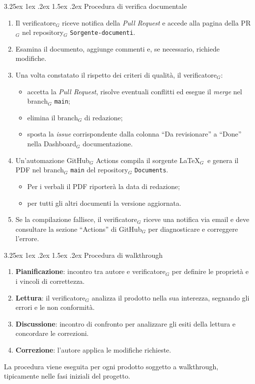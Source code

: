 \documentclass[a4paper, 10pt]{article}
\makeatletter
\renewcommand\paragraph{\@startsection{paragraph}{4}{\z@}%
  {3.25ex \@plus1ex \@minus .2ex}%
  {1.5ex \@plus .2ex}%
  {\normalfont\normalsize\bfseries}}
\makeatother
\begin{document}
\paragraph{Procedura di verifica documentale}
\begin{enumerate}
    \item Il verificatore$_G$ riceve notifica della \emph{Pull Request} e accede alla pagina della PR$_G$ nel repository$_G$ \texttt{Sorgente-documenti}.
    \item Esamina il documento, aggiunge commenti e, se necessario, richiede modifiche.
    \item Una volta constatato il rispetto dei criteri di qualità, il verificatore$_G$:
    \begin{itemize}
        \item accetta la \emph{Pull Request}, risolve eventuali conflitti ed esegue il \emph{merge} nel branch$_G$ \texttt{main};
        \item elimina il branch$_G$ di redazione;
        \item sposta la \emph{issue} corrispondente dalla colonna ``Da revisionare'' a ``Done'' nella Dashboard$_G$ documentazione.
    \end{itemize}
    \item Un'automazione GitHub$_G$ Actions compila il sorgente \LaTeX$_G$\ e genera il PDF nel branch$_G$ \texttt{main} del repository$_G$ \texttt{Documents}.
    \begin{itemize}
        \item Per i verbali il PDF riporterà la data di redazione;
        \item per tutti gli altri documenti la versione aggiornata.
    \end{itemize}
    \item Se la compilazione fallisce, il verificatore$_G$ riceve una notifica via email e deve consultare la sezione ``Actions'' di GitHub$_G$ per diagnosticare e correggere l'errore.
\end{enumerate}

\paragraph{Procedura di walkthrough}
\begin{enumerate}
    \item \textbf{Pianificazione}: incontro tra autore e verificatore$_G$ per definire le proprietà e i vincoli di correttezza.
    \item \textbf{Lettura}: il verificatore$_G$ analizza il prodotto nella sua interezza, segnando gli errori e le non conformità.
    \item \textbf{Discussione}: incontro di confronto per analizzare gli esiti della lettura e concordare le correzioni.
    \item \textbf{Correzione}: l'autore applica le modifiche richieste.
\end{enumerate}
La procedura viene eseguita per ogni prodotto soggetto a walkthrough, tipicamente nelle fasi iniziali del progetto.
\end{document}
